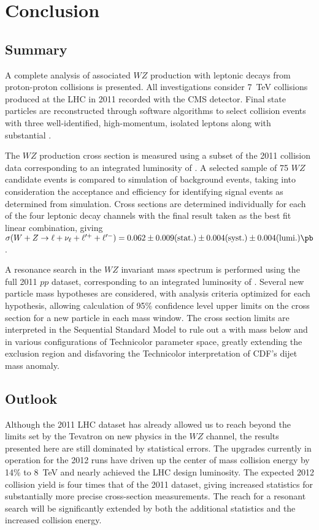 \chapter{Conclusion}

\section{Summary}

A complete analysis of associated $WZ$ production with leptonic decays from proton-proton collisions is presented.  All investigations consider \SI{7}{\TeV} collisions produced at the LHC in 2011 recorded with the CMS detector.  Final state particles are reconstructed through software algorithms to select collision events with three well-identified, high-momentum, isolated leptons along with substantial \MET.

The $WZ$ production cross section is measured using a subset of the 2011 collision data corresponding to an integrated luminosity of \earlylumi.  A selected sample of 75 $WZ$ candidate events is compared to simulation of background events, taking into consideration the acceptance and efficiency for identifying signal events as determined from simulation.  Cross sections are determined individually for each of the four leptonic decay channels with the final result taken as the best fit linear combination, giving $\sigma(W + Z \to \ell + \nu_\ell + \ell^{\prime +} + \ell^{\prime -}) = 0.062 \pm 0.009 (\text{stat.}) \pm 0.004 (\text{syst.}) \pm 0.004 (\text{lumi.}) \pb$.

A resonance search in the $WZ$ invariant mass spectrum is performed using the full 2011 $pp$ dataset, corresponding to an integrated luminosity of \jsonlumi.  Several new particle mass hypotheses are considered, with analysis criteria optimized for each hypothesis, allowing calculation of 95\% confidence level upper limits on the cross section for a new particle in each mass window.  The cross section limits are interpreted in the Sequential Standard Model to rule out a \wprime{} with mass below  and in various configurations of Technicolor parameter space, greatly extending the \technirho exclusion region and disfavoring the Technicolor interpretation of CDF's dijet mass anomaly.

\section{Outlook}

Although the 2011 LHC dataset has already allowed us to reach beyond the limits set by the Tevatron on new physics in the $WZ$ channel, the results presented here are still dominated by statistical errors.  The upgrades currently in operation for the 2012 runs have driven up the center of mass collision energy by 14\% to \SI{8}{\TeV} and nearly achieved the LHC design luminosity.  The expected 2012 collision yield is four times that of the 2011 dataset, giving increased statistics for substantially more precise cross-section measurements.  The reach for a resonant search will be significantly extended by both the additional statistics and the increased collision energy.
